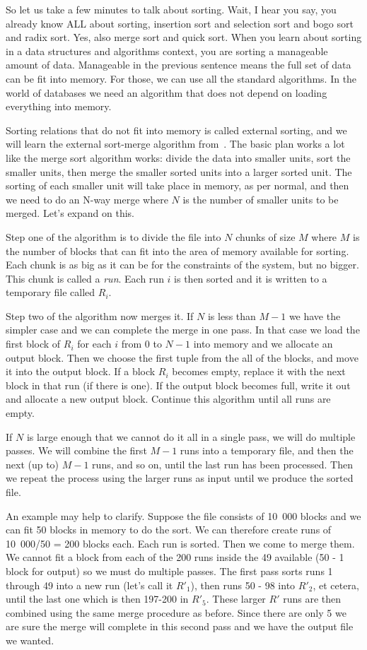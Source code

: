 \documentclass[a4paper]{report}
\begin{document}
So let us take a few minutes to talk about sorting. Wait, I hear you say, you already know ALL about sorting, insertion sort and selection sort and bogo sort and radix sort. Yes, also merge sort and quick sort. When you learn about sorting in a data structures and algorithms context, you are sorting a manageable amount of data. Manageable in the previous sentence means the full set of data can be fit into memory. For those, we can use all the standard algorithms. In the world of databases we need an algorithm that does not depend on loading everything into memory.

Sorting relations that do not fit into memory is called external sorting, and we will learn the external sort-merge algorithm from~\cite{dsc}. The basic plan works a lot like the merge sort algorithm works: divide the data into smaller units, sort the smaller units, then merge the smaller sorted units into a larger sorted unit. The sorting of each smaller unit will take place in memory, as per normal, and then we need to do an N-way merge where $N$ is the number of smaller units to be merged. Let's expand on this.

Step one of the algorithm is to divide the file into $N$ chunks of size $M$ where $M$ is the number of blocks that can fit into the area of memory available for sorting. Each chunk is as big as it can be for the constraints of the system, but no bigger. This chunk is called a \textit{run}. Each run $i$ is then sorted and it is written to a temporary file called $R_{i}$.

Step two of the algorithm now merges it. If $N$ is less than $M-1$ we have the simpler case and we can complete the merge in one pass. In that case we load the first block of $R_{i}$ for each $i$ from $0$ to $N-1$ into memory and we allocate an output block. Then we choose the first tuple from the all of the blocks, and move it into the output block. If a block $R_{i}$ becomes empty, replace it with the next block in that run (if there is one). If the output block becomes full, write it out and allocate a new output block. Continue this algorithm until all runs are empty. 

If $N$ is large enough that we cannot do it all in a single pass, we will do multiple passes. We will combine the first $M-1$ runs into a temporary file, and then the next (up to) $M-1$ runs, and so on, until the last run has been processed. Then we repeat the process using the larger runs as input until we produce the sorted file.

An example may help to clarify. Suppose the file consists of 10~000 blocks and we can fit 50 blocks in memory to do the sort. We can therefore create runs of 10~000/50 = 200 blocks each. Each run is sorted. Then we come to merge them. We cannot fit a block from each of the 200 runs inside the 49 available (50 - 1 block for output) so we must do multiple passes. The first pass sorts runs 1 through 49 into a new run (let's call it $R'_{1}$), then runs 50 - 98 into $R'_{2}$, et cetera, until the last one which is then 197-200 in $R'_{5}$. These larger $R'$ runs are then combined using the same merge procedure as before. Since there are only 5 we are sure the merge will complete in this second pass and we have the output file we wanted.
\end{document}
